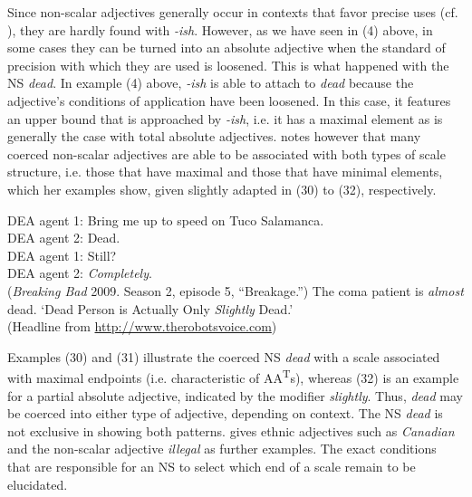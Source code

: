\documentclass[output=paper]{langsci/langscibook}
\begin{document}
Since non-scalar adjectives generally occur in contexts that favor precise uses (cf. \citealt[95--96]{Burnett2017}), they are hardly found with \textit{-ish}. However, as we have seen in (4) above, in some cases they can be turned into an absolute adjective when the standard of precision with which they are used is loosened. This is what happened with the NS \textit{dead}. In example (4) above, \textit{-ish} is able to attach to \textit{dead} because the adjective's conditions of application have been loosened. In this case, it features an upper bound that is approached by \textit{-ish}, i.e. it has a maximal element as is generally the case with total absolute adjectives. \textcite[112--113]{Burnett2017} notes however that many coerced non-scalar adjectives are able to be associated with both types of scale structure, i.e. those that have maximal and those that have minimal elements, which her examples show, given slightly adapted in (30) to (32), respectively.

\ea
	    DEA agent 1: Bring me up to speed on Tuco Salamanca. \\
		DEA agent 2: Dead. \\
		DEA agent 1: Still? \\
		DEA agent 2: \textit{Completely}. \\
		(\textit{Breaking Bad} 2009. Season 2, episode 5, ``Breakage.'')
\z
\ea
	The coma patient is \textit{almost} dead.
\z
\ea
	`Dead Person is Actually Only \textit{Slightly} Dead.' \\
		(Headline from \url{http://www.therobotsvoice.com})
\z

Examples (30) and (31) illustrate the coerced NS \textit{dead} with a scale associated with maximal endpoints (i.e. characteristic of AA\textsuperscript{T}s), whereas (32) is an example for a partial absolute adjective, indicated by the modifier \textit{slightly}. Thus, \textit{dead} may be coerced into either type of adjective, depending on context. The NS \textit{dead} is not exclusive in showing both patterns. \textcite[113]{Burnett2017} gives ethnic adjectives such as \textit{Canadian} and the non-scalar adjective \textit{illegal} as further examples. The exact conditions that are responsible for an NS to select which end of a scale remain to be elucidated.
\end{document}
